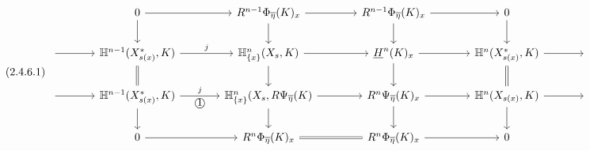 \begin{equation}\tag{2.4.6.1}
\begin{tikzcd}[column sep=large]
& 0 \arrow[r] \arrow[d] & R^{n-1}\Phi_{\overline{\eta}}(K)_x \arrow[r] \arrow[d] & R^{n-1}\Phi_{\overline{\eta}}(K)_x \arrow[r] \arrow[d] & 0 \arrow[d] & \\
{} \arrow[r] & \mathbb{H}^{n-1}(X^{*}_{s(x)},K) \arrow[r, "j"] \arrow[d, equal] & \mathbb{H}^{n}_{\{x\}}(X_s, K) \arrow[r] \arrow[d] & \underline{H}^{n}(K)_x \arrow[r] \arrow[d] & \mathbb{H}^{n}(X^{*}_{s(x)}, K) \arrow[r] \arrow[d, equal] & {} \\
{} \arrow[r] & \mathbb{H}^{n-1}(X^{*}_{s(x)}, K) \arrow[r, "j", "\mbox{\textcircled{1}}"'] \arrow[d] & \mathbb{H}^{n}_{\{x\}}(X_s, R\Psi_{\overline{\eta}}(K) \arrow[r] \arrow[d] & R^{n}\Psi_{\overline{\eta}}(K)_x \arrow[r] \arrow[d] & \mathbb{H}^{n}(X_{s(x)},K) \arrow[r] \arrow[d] & {} \\
& 0 \arrow[r] & R^{n}\Phi_{\overline{\eta}}(K)_x \arrow[r, equal] & R^{n}\Phi_{\overline{\eta}}(K)_x \arrow[r] & 0 &
\end{tikzcd}
\end{equation}
